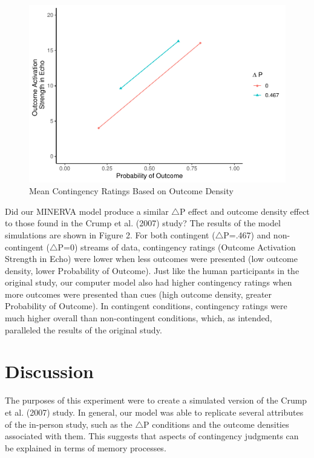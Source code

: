 \documentclass[
  english,
  man,floatsintext]{apa6}
\begin{document}
\begin{figure}
\centering
\includegraphics{thesis_revised_files/figure-latex/unnamed-chunk-3-1.pdf}
\caption{\label{fig:unnamed-chunk-3}Mean Contingency Ratings Based on Outcome Density}
\end{figure}

Did our MINERVA model produce a similar \(\triangle\)P effect and outcome density effect to those found in the Crump et al. (2007) study? The results of the model simulations are shown in Figure 2. For both contingent (\(\triangle\)P=.467) and non-contingent (\(\triangle\)P=0) streams of data, contingency ratings (Outcome Activation Strength in Echo) were lower when less outcomes were presented (low outcome density, lower Probability of Outcome). Just like the human participants in the original study, our computer model also had higher contingency ratings when more outcomes were presented than cues (high outcome density, greater Probability of Outcome). In contingent conditions, contingency ratings were much higher overall than non-contingent conditions, which, as intended, paralleled the results of the original study.

\hypertarget{discussion}{%
\section{Discussion}\label{discussion}}

The purposes of this experiment were to create a simulated version of the Crump et al. (2007) study. In general, our model was able to replicate several attributes of the in-person study, such as the \(\triangle\)P conditions and the outcome densities associated with them. This suggests that aspects of contingency judgments can be explained in terms of memory processes.
\end{document}
